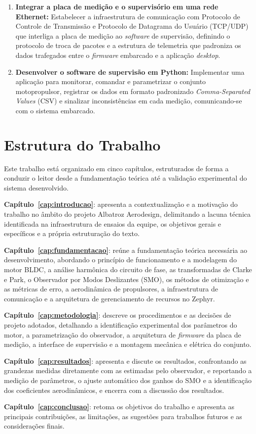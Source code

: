 \begin{enumerate}
    \item \textbf{Integrar a placa de medição e o supervisório em uma rede
    Ethernet:} Estabelecer a infraestrutura de comunicação com Protocolo de Controle de Transmissão e Protocolo de Datagrama do Usuário (TCP/UDP) que interliga
    a placa de medição ao \textit{software} de supervisão, definindo o protocolo de
    troca de pacotes e a estrutura de telemetria que padroniza os dados
    trafegados entre o \textit{firmware} embarcado e a aplicação \textit{desktop}.

    \item \textbf{Desenvolver o software de supervisão em Python:} Implementar
    uma aplicação para monitorar, comandar e parametrizar o conjunto
    motopropulsor, registrar os dados em formato padronizado \textit{Comma-Separated Values} (CSV) e sinalizar
    inconsistências em cada medição, comunicando-se com o sistema embarcado.
\end{enumerate}

\section{Estrutura do Trabalho}

Este trabalho está organizado em cinco capítulos, estruturados de forma a
conduzir o leitor desde a fundamentação teórica até a validação experimental
do sistema desenvolvido.

\textbf{Capítulo~\ref{cap:introducao}}: apresenta a contextualização e a
motivação do trabalho no âmbito do projeto Albatroz Aerodesign, delimitando a
lacuna técnica identificada na infraestrutura de ensaios da equipe, os
objetivos gerais e específicos e a própria estruturação do texto.

\textbf{Capítulo~\ref{cap:fundamentacao}}: reúne a fundamentação teórica
necessária ao desenvolvimento, abordando o princípio de funcionamento e a
modelagem do motor BLDC, a análise harmônica do circuito de fase, as
transformadas de Clarke e Park, o Observador por Modos Deslizantes (SMO), os
métodos de otimização e as métricas de erro, a aerodinâmica de propulsores, a
infraestrutura de comunicação e a arquitetura de gerenciamento de recursos no
Zephyr.

\textbf{Capítulo~\ref{cap:metodologia}}: descreve os procedimentos e as
decisões de projeto adotados, detalhando a identificação experimental dos
parâmetros do motor, a parametrização do observador, a arquitetura de
\textit{firmware} da placa de medição, a interface de supervisão e a
montagem mecânica e elétrica do conjunto.

\textbf{Capítulo~\ref{cap:resultados}}: apresenta e discute os resultados,
confrontando as grandezas medidas diretamente com as estimadas pelo
observador, e reportando a medição de parâmetros, o ajuste automático dos
ganhos do SMO e a identificação dos coeficientes aerodinâmicos, e encerra com
a discussão dos resultados.

\textbf{Capítulo~\ref{cap:conclusao}}: retoma os objetivos do trabalho e
apresenta as principais contribuições, as limitações, as sugestões para
trabalhos futuros e as considerações finais.
